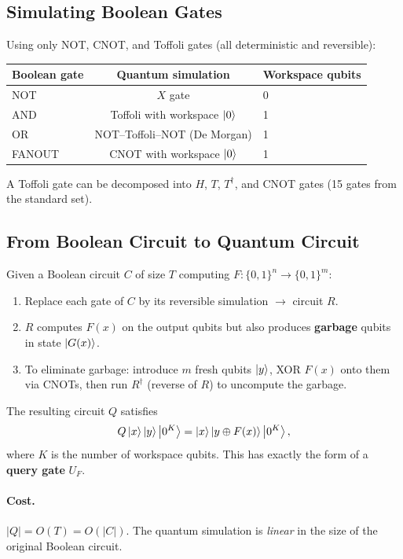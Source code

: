 \documentclass[11pt]{article}
\theoremstyle{definition}
\begin{document}
\subsection{Simulating Boolean Gates}

Using only NOT, CNOT, and Toffoli gates (all deterministic and reversible):

\begin{center}
\begin{tabular}{lcl}
\hline
\textbf{Boolean gate} & \textbf{Quantum simulation} & \textbf{Workspace qubits} \\\hline
NOT & $X$ gate & 0 \\
AND & Toffoli with workspace $\ket{0}$ & 1 \\
OR & NOT--Toffoli--NOT (De Morgan) & 1 \\
FANOUT & CNOT with workspace $\ket{0}$ & 1 \\
\hline
\end{tabular}
\end{center}

A Toffoli gate can be decomposed into $H$, $T$, $T^\dagger$, and CNOT gates (15 gates from the standard set).

\subsection{From Boolean Circuit to Quantum Circuit}

Given a Boolean circuit $C$ of size $T$ computing $F:\{0,1\}^n\to\{0,1\}^m$:

\begin{enumerate}
    \item Replace each gate of $C$ by its reversible simulation $\to$ circuit $R$.
    \item $R$ computes $F(x)$ on the output qubits but also produces \textbf{garbage} qubits in state $\ket{G(x)}$.
    \item To eliminate garbage: introduce $m$ fresh qubits $\ket{y}$, XOR $F(x)$ onto them via CNOTs, then run $R^\dagger$ (reverse of $R$) to uncompute the garbage.
\end{enumerate}

The resulting circuit $Q$ satisfies
\[
    Q\ket{x}\ket{y}\ket{0^K} = \ket{x}\ket{y\oplus F(x)}\ket{0^K},
\]
where $K$ is the number of workspace qubits.  This has exactly the form of a \textbf{query gate} $U_F$.

\paragraph{Cost.}  $|Q|=O(T)=O(|C|)$.  The quantum simulation is \emph{linear} in the size of the original Boolean circuit.
\end{document}
